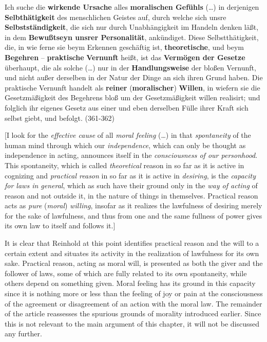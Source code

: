 Ich suche die \textbf{wirkende Ursache} alles \textbf{moralischen Gef\"{u}hls} (\ldots ) in derjenigen \textbf{Selbth\"{a}tigkeit} des menschlichen Geistes auf, durch welche sich unsre \textbf{Selbstst\"{a}ndigkeit}, die sich nur durch Unabh\"{a}ngigkeit im Handeln denken l\"{a}\ss{}t, in dem \textbf{Bewu\ss{}tseyn unsrer Personalit\"{a}t}, ank\"{u}ndiget. Diese Selbstth\"{a}tigkeit, die, in wie ferne sie beym Erkennen gesch\"{a}ftig ist, \textbf{theoretische}, und beym \textbf{Begehren} {--} \textbf{praktische} \textbf{Vernunft} hei\ss{}t, ist das \textbf{Verm\"{o}gen der Gesetze} \"{u}berhaupt, die als solche (\ldots ) nur in der \textbf{Handlungsweise} der blo\ss{}en Vernunft, und nicht au\ss{}er derselben in der Natur der Dinge an sich ihren Grund haben. Die praktische Vernunft handelt als \textbf{reiner} (\textbf{moralischer}) \textbf{Willen}, in wiefern sie die Gesetzm\"{a}\ss{}igkeit des Begehrens blo\ss{} um der Gesetzm\"{a}\ss{}igkeit willen realisirt; und folglich ihr eigenes Gesetz aus einer und eben derselben F\"{u}lle ihrer Kraft sich selbst giebt, und befolgt. (361{-}362)

[I look for the \textit{effective cause} of all \textit{moral feeling} (\ldots ) in that \textit{spontaneity} of the human mind through which our \textit{independence}, which can only be thought as independence in acting, announces itself in the \textit{consciousness of our personhood}. This spontaneity, which is called \textit{theoretical} reason in so far as it is active in cognizing and \textit{practical reason} in so far as it is active in \textit{desiring}, is the \textit{capacity for laws in general}, which as such have their ground only in the \textit{way of acting} of reason and not outside it, in the nature of things in themselves. Practical reason acts as \textit{pure} (\textit{moral}) \textit{willing}, insofar as it realizes the lawfulness of desiring merely for the sake of lawfulness, and thus from one and the same fullness of power gives its own law to itself and follows it.]

It is clear that Reinhold at this point identifies practical reason and the will to a certain extent and situates its activity in the realization of lawfulness for its own sake. Practical reason, acting as moral will, is presented as both the giver and the follower of laws, some of which are fully related to its own spontaneity, while others depend on something given. Moral feeling has its ground in this capacity since it is nothing more or less than the feeling of joy or pain at the consciousness of the agreement or disagreement of an action with the moral law. The remainder of the article reassesses the spurious grounds of morality introduced earlier. Since this is not relevant to the main argument of this chapter, it will not be discussed any further. 

